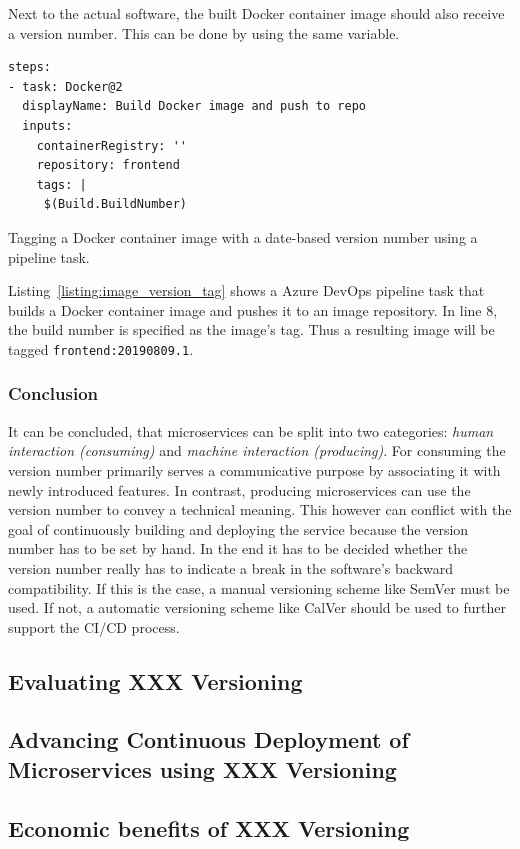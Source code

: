 Next to the actual software, the built Docker container image should also
receive a version number. This can be done by using the same variable.

\begin{listing}[H]
  \begin{verbatim}
steps:
- task: Docker@2
  displayName: Build Docker image and push to repo
  inputs:
    containerRegistry: ''
    repository: frontend
    tags: |
     $(Build.BuildNumber)
  \end{verbatim}
  \caption{Tagging a Docker container image with a date-based version number
  using a pipeline task.}%
  \label{listing:image_version_tag}
\end{listing}

Listing~\ref{listing:image_version_tag} shows a Azure DevOps pipeline task that
builds a Docker container image and pushes it to an image repository. In line
8, the build number is specified as the image's tag. Thus a resulting image
will be tagged \texttt{frontend:20190809.1}.

\subsubsection{Conclusion}%
\label{ssub:Conclusion}
It can be concluded, that microservices can be split into two categories:
\textit{human interaction (consuming)} and \textit{machine interaction
(producing)}. For consuming the version number primarily serves a communicative
purpose by associating it with newly introduced features. In contrast,
producing microservices can use the version number to convey a technical
meaning. This however can conflict with the goal of continuously building and
deploying the service because the version number has to be set by hand. In the
end it has to be decided whether the version number really has to indicate a
break in the software's backward compatibility. If this is the case, a manual
versioning scheme like SemVer must be used. If not, a automatic versioning
scheme like CalVer should be used to further support the \ac{CI}/\ac{CD}
process.

\subsection{Evaluating XXX Versioning}%
\label{sub:Evaluating_XXX_Versioning}

\subsection{Advancing Continuous Deployment of Microservices using XXX Versioning}%
\label{sub:Advancing_Continuous_Deployment_of_Microservices_using_XXX_Versioning}

\subsection{Economic benefits of XXX Versioning}%
\label{sub:Economic_benefits_of_XXX_Versioning}

